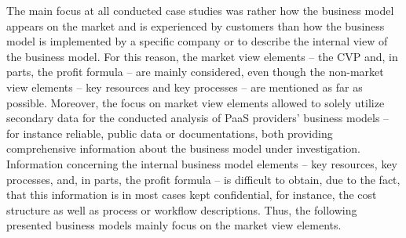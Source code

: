 The main focus at all conducted case studies was rather how the business model appears on the market and is experienced by customers than how the business model is implemented by a specific company or to describe the internal view of the business model. For this reason, the market view elements -- the \ac{CVP} and, in parts, the profit formula -- are mainly considered, even though the non-market view elements -- key resources and key processes -- are mentioned as far as possible. Moreover, the focus on market view elements allowed to solely utilize secondary data for the conducted analysis of \ac{PaaS} providers' business models -- for instance reliable, public data or documentations, both providing comprehensive information about the business model under investigation. Information concerning the internal business model elements -- key resources, key processes, and, in parts, the profit formula -- is difficult to obtain, due to the fact, that this information is in most cases kept confidential, for instance, the cost structure as well as process or workflow descriptions. Thus, the following presented business models mainly focus on the market view elements.
























